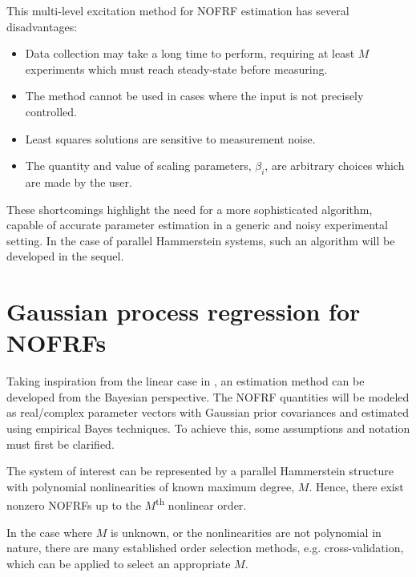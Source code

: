 This multi-level excitation method for NOFRF estimation has several disadvantages:
\begin{itemize}
\item Data collection may take a long time to perform, requiring at least $M$ experiments which must reach steady-state before measuring.
\item The method cannot be used in cases where the input is not precisely controlled.
\item Least squares solutions are sensitive to measurement noise.
\item The quantity and value of scaling parameters, $\beta_i$, are arbitrary choices which are made by the user.
\end{itemize}
These shortcomings highlight the need for a more sophisticated algorithm, capable of accurate parameter estimation in a generic and noisy experimental setting. In the case of parallel Hammerstein systems, such an algorithm will be developed in the sequel.


\section{Gaussian process regression for NOFRFs}
\label{sec:NOFRFs_GPR}

Taking inspiration from the linear case in \cite{Lataire2016}, an estimation method can be developed from the Bayesian perspective. The NOFRF quantities will be modeled as real/complex parameter vectors with Gaussian prior covariances and estimated using empirical Bayes techniques. To achieve this, some assumptions and notation must first be clarified. 

\begin{assum}
\label{ass:HammersteinPolynomial}
The system of interest can be represented by a parallel Hammerstein structure with polynomial nonlinearities of known maximum degree, $M$. Hence, there exist nonzero NOFRFs up to the $M$\textsuperscript{th} nonlinear order.
\end{assum}

\begin{rem}
In the case where $M$ is unknown, or the nonlinearities are not polynomial in nature, there are many established order selection methods, e.g. cross-validation, which can be applied to select an appropriate $M$. 
\end{rem}

